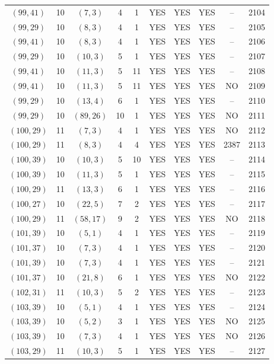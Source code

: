 \begin{longtable}{|c|c|c|c|c|c|c|c|c|c|}
$(99, 41)$ & 10 & $(7, 3)$ & 4 & 1 & YES & YES & YES & -- & 2104\\
$(99, 29)$ & 10 & $(8, 3)$ & 4 & 1 & YES & YES & YES & -- & 2105\\
$(99, 41)$ & 10 & $(8, 3)$ & 4 & 1 & YES & YES & YES & -- & 2106\\
$(99, 29)$ & 10 & $(10, 3)$ & 5 & 1 & YES & YES & YES & -- & 2107\\
$(99, 41)$ & 10 & $(11, 3)$ & 5 & 11 & YES & YES & YES & -- & 2108\\
$(99, 41)$ & 10 & $(11, 3)$ & 5 & 11 & YES & YES & YES & NO & 2109\\
$(99, 29)$ & 10 & $(13, 4)$ & 6 & 1 & YES & YES & YES & -- & 2110\\
$(99, 29)$ & 10 & $(89, 26)$ & 10 & 1 & YES & YES & YES & NO & 2111\\
$(100, 29)$ & 11 & $(7, 3)$ & 4 & 1 & YES & YES & YES & NO & 2112\\
$(100, 29)$ & 11 & $(8, 3)$ & 4 & 4 & YES & YES & YES & 2387 & 2113\\
$(100, 39)$ & 10 & $(10, 3)$ & 5 & 10 & YES & YES & YES & -- & 2114\\
$(100, 39)$ & 10 & $(11, 3)$ & 5 & 1 & YES & YES & YES & -- & 2115\\
$(100, 29)$ & 11 & $(13, 3)$ & 6 & 1 & YES & YES & YES & -- & 2116\\
$(100, 27)$ & 10 & $(22, 5)$ & 7 & 2 & YES & YES & YES & -- & 2117\\
$(100, 29)$ & 11 & $(58, 17)$ & 9 & 2 & YES & YES & YES & NO & 2118\\
$(101, 39)$ & 10 & $(5, 1)$ & 4 & 1 & YES & YES & YES & -- & 2119\\
$(101, 37)$ & 10 & $(7, 3)$ & 4 & 1 & YES & YES & YES & -- & 2120\\
$(101, 39)$ & 10 & $(7, 3)$ & 4 & 1 & YES & YES & YES & -- & 2121\\
$(101, 37)$ & 10 & $(21, 8)$ & 6 & 1 & YES & YES & YES & NO & 2122\\
$(102, 31)$ & 11 & $(10, 3)$ & 5 & 2 & YES & YES & YES & -- & 2123\\
$(103, 39)$ & 10 & $(5, 1)$ & 4 & 1 & YES & YES & YES & -- & 2124\\
$(103, 39)$ & 10 & $(5, 2)$ & 3 & 1 & YES & YES & YES & NO & 2125\\
$(103, 39)$ & 10 & $(7, 3)$ & 4 & 1 & YES & YES & YES & NO & 2126\\
$(103, 29)$ & 11 & $(10, 3)$ & 5 & 1 & YES & YES & YES & -- & 2127\\

\end{longtable}
